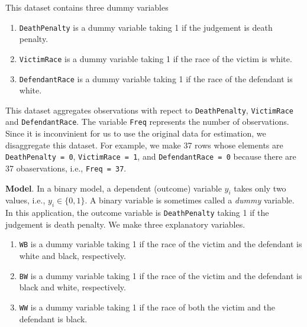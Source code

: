 \documentclass[
  12pt,
]{article}
\newenvironment{Shaded}{\begin{snugshade}}{\end{snugshade}}
\newcommand{\DecValTok}[1]{\textcolor[rgb]{0.00,0.00,0.81}{#1}}
\newcommand{\KeywordTok}[1]{\textcolor[rgb]{0.13,0.29,0.53}{\textbf{#1}}}
\newcommand{\NormalTok}[1]{#1}
\newcommand{\OperatorTok}[1]{\textcolor[rgb]{0.81,0.36,0.00}{\textbf{#1}}}
\newcommand{\StringTok}[1]{\textcolor[rgb]{0.31,0.60,0.02}{#1}}
\providecommand{\tightlist}{%
  \setlength{\itemsep}{0pt}\setlength{\parskip}{0pt}}
\begin{document}
This dataset contains three dummy variables

\begin{enumerate}
\def\labelenumi{\arabic{enumi}.}
\tightlist
\item
  \texttt{DeathPenalty} is a dummy variable taking 1 if the judgement is
  death penalty.
\item
  \texttt{VictimRace} is a dummy variable taking 1 if the race of the
  victim is white.
\item
  \texttt{DefendantRace} is a dummy variable taking 1 if the race of the
  defendant is white.
\end{enumerate}

This dataset aggregates observations with repect to
\texttt{DeathPenalty}, \texttt{VictimRace} and \texttt{DefendantRace}.
The variable \texttt{Freq} represents the number of observations. Since
it is inconvinient for us to use the original data for estimation, we
disaggregate this dataset. For example, we make 37 rows whose elements
are \texttt{DeathPenalty\ =\ 0}, \texttt{VictimRace\ =\ 1}, and
\texttt{DefendantRace\ =\ 0} because there are 37 obaservations, i.e.,
\texttt{Freq\ =\ 37}.

\begin{Shaded}
\end{Shaded}

\noindent \textbf{Model}. In a binary model, a dependent (outcome)
variable \(y_i\) takes only two values, i.e., \(y_i \in \{0, 1\}\). A
binary variable is sometimes called a \emph{dummy} variable. In this
application, the outcome variable is \texttt{DeathPenalty} taking 1 if
the judgement is death penalty. We make three explanatory variables.

\begin{enumerate}
\def\labelenumi{\arabic{enumi}.}
\tightlist
\item
  \texttt{WB} is a dummy variable taking 1 if the race of the victim and
  the defendant is white and black, respectively.
\item
  \texttt{BW} is a dummy variable taking 1 if the race of the victim and
  the defendant is black and white, respectively.
\item
  \texttt{WW} is a dummy variable taking 1 if the race of both the
  victim and the defendant is black.
\end{enumerate}
\end{document}
